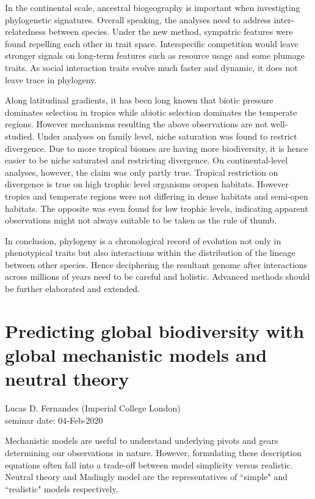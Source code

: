 \documentclass{article}
\begin{document}
    In the continental scale, ancestral biogeography is important when investigting phylogenetic signatures.  Overall speaking, the analyses need to address inter-relatedness between species.  Under the new method, sympatric features were found repelling each other in trait space.  Interspecific competition would leave stronger signals on long-term features such as resource usage and some plumage traits.  As social interaction traits evolve much faster and dynamic, it does not leave trace in phylogeny.
    
    Along latitudinal gradients, it has been long known that biotic pressure dominates selection in tropics while abiotic selection dominates the temperate regions.  However mechanisms resulting the above observations are not well-studied.  Under analyses on family level, niche saturation was found to restrict divergence.  Due to more tropical biomes are having more biodiversity, it is hence easier to be niche saturated and restricting divergence.  On continental-level analyses, however, the claim was only partly true.  Tropical restriction on divergence is true on high trophic level organisms oropen habitats.  However tropics and temperate regions were not differing in dense habitats and semi-open habitats.  The opposite was even found for low trophic levels, indicating apparent observations might not always suitable to be taken as the rule of thumb.
    
    In conclusion, phylogeny is a chronological record of evolution not only in phenotypical traits but also interactions within the distribution of the lineage between other species.  Hence deciphering the resultant genome after interactions across millions of years need to be careful and holistic.  Advanced methods should be further elaborated and extended.
    \clearpage
    
    \section{Predicting global biodiversity with global mechanistic models and neutral theory}
    \begin{flushright}
        \large{Lucas D. Fernandes (Imperial College London)}\\
        seminar date: 04-Feb-2020
    \end{flushright}
    Mechanistic models are useful to understand underlying pivots and gears determining our observations in nature.  However, formulating these description equations often fall into a trade-off between model simplicity versus realistic.  Neutral theory and Madingly model are the representatives of ``simple" and ``realistic" models respectively.
    
\end{document}
